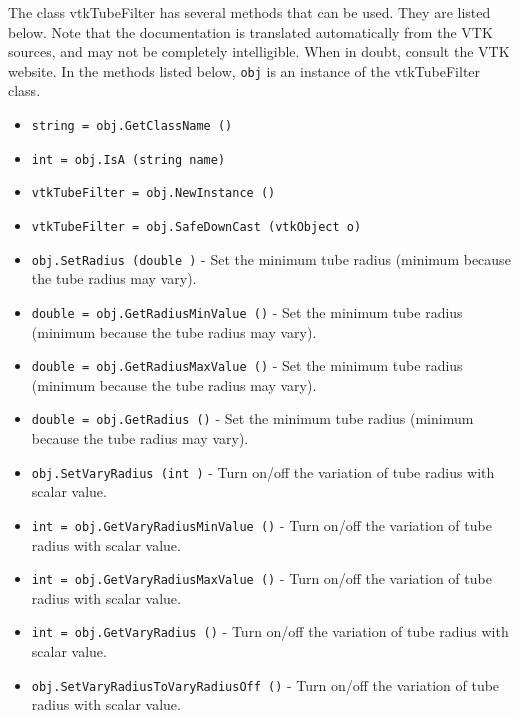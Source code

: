 The class vtkTubeFilter has several methods that can be used.
  They are listed below.
Note that the documentation is translated automatically from the VTK sources,
and may not be completely intelligible.  When in doubt, consult the VTK website.
In the methods listed below, \verb|obj| is an instance of the vtkTubeFilter class.
\begin{itemize}
\item  \verb|string = obj.GetClassName ()|

\item  \verb|int = obj.IsA (string name)|

\item  \verb|vtkTubeFilter = obj.NewInstance ()|

\item  \verb|vtkTubeFilter = obj.SafeDownCast (vtkObject o)|

\item  \verb|obj.SetRadius (double )| -  Set the minimum tube radius (minimum because the tube radius may vary).

\item  \verb|double = obj.GetRadiusMinValue ()| -  Set the minimum tube radius (minimum because the tube radius may vary).

\item  \verb|double = obj.GetRadiusMaxValue ()| -  Set the minimum tube radius (minimum because the tube radius may vary).

\item  \verb|double = obj.GetRadius ()| -  Set the minimum tube radius (minimum because the tube radius may vary).

\item  \verb|obj.SetVaryRadius (int )| -  Turn on/off the variation of tube radius with scalar value.

\item  \verb|int = obj.GetVaryRadiusMinValue ()| -  Turn on/off the variation of tube radius with scalar value.

\item  \verb|int = obj.GetVaryRadiusMaxValue ()| -  Turn on/off the variation of tube radius with scalar value.

\item  \verb|int = obj.GetVaryRadius ()| -  Turn on/off the variation of tube radius with scalar value.

\item  \verb|obj.SetVaryRadiusToVaryRadiusOff ()| -  Turn on/off the variation of tube radius with scalar value.


\end{itemize}
